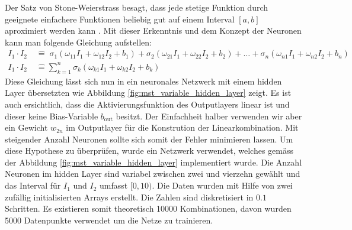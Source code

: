 Der Satz von Stone-Weierstrass besagt, dass jede stetige Funktion durch geeignete einfachere Funktionen beliebig gut auf einem Interval $[a, b]$ aproximiert werden kann \cite{wiki:StoneWeierstrass}. Mit dieser Erkenntnis und dem Konzept der Neuronen kann man folgende Gleichung aufstellen:
\begin{align}
I_{1} \cdot I_{2} \; & \hat{=} \; \sigma_{1} \left( \omega_{11} I_1 + \omega_{12} I_2 + b_{1} \right) + \sigma_{2} \left( \omega_{21} I_1 + \omega_{22} I_2 + b_{2}  \right) + \dots  + \sigma_{n} \left( \omega_{n1} I_1 + \omega_{n2} I_2 + b_{n} \right) \\
I_{1} \cdot I_{2} \; & \hat{=} \sum_{k=1}^{n} \sigma_{k} \left( \omega_{k1} I_1 + \omega_{k2} I_2 + b_{k} \right)
\label{eq:mst_traivial_sum}
\end{align}
Diese Gleichung lässt sich nun in ein neuronales Netzwerk mit einem hidden Layer übersetzten wie Abbildung \ref{fig:mst_variable_hidden_layer} zeigt. Es ist auch ersichtlich, dass die Aktivierungsfunktion des Outputlayers linear ist und dieser keine Bias-Variable $b_{\text{out}}$ besitzt. Der Einfachheit halber verwenden wir aber ein Gewicht $w_{2n}$ im Outputlayer für die Konstrution der Linearkombination.
%
Mit steigender Anzahl Neuronen sollte sich somit der Fehler minimieren lassen. Um diese Hypothese zu überprüfen, wurde ein Netzwerk verwendet, welches gemäss der Abbildung \ref{fig:mst_variable_hidden_layer} implementiert wurde. Die Anzahl Neuronen im hidden Layer sind variabel zwischen zwei und vierzehn gewählt und das Interval für $I_1$ und $I_2$ umfasst $[0, 10)$. Die Daten wurden mit Hilfe von zwei zufällig initialisierten Arrays erstellt. Die Zahlen sind diskretisiert in $0.1$ Schritten. Es existieren somit theoretisch 10000 Kombinationen, davon wurden 5000 Datenpunkte verwendet um die Netze zu trainieren.

